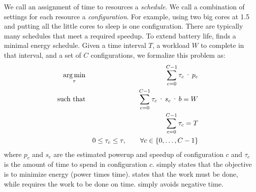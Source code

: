 We call an assignment of time to resources a \emph{schedule}. We call
a combination of settings for each resource a \emph{configuration}.
For example, using two big cores at 1.5 \GHz and putting all the
little cores to sleep is one configuration.  There are typically many
schedules that meet a required speedup.  To extend battery life,
\SYSTEM{} finds a minimal energy schedule. Given a time interval $T$,
a workload $W$ to complete in that interval, and a set of $C$
configurations, we formalize this problem as:
\begin{eqnarray}
  \argmin_{\tau} && \sum_{c=0}^{C-1} \tau_c \cdot p_c \label{eqn:power} \\
  \text{such that} %
  && \sum_{c=0}^{C-1} \tau_c \cdot s_c \cdot b =  W \label{eqn:work} \\
  && \sum_{c=0}^{C-1} \tau_c =  T \label{eqn:deadline} \\
  && 0 \le \tau_c \le \tau, \qquad \forall c \in \{0,\ldots,C-1\} \label{eqn:time}
\end{eqnarray}
where $p_c$ and $s_c$ are the estimated powerup and speedup of
configuration $c$ and $\tau_c$ is the amount of time to spend in
configuration $c$.   simply states that the objective is
to minimize energy (power times time).   states that the
work must be done, while  requires the work to be
done on time.   simply avoids negative time.


